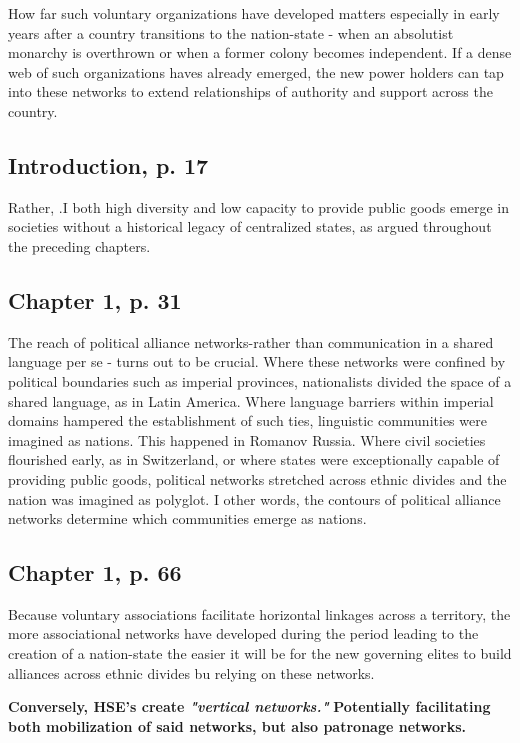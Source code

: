 \documentclass[12pt]{article}
\begin{document}
\bigskip

How far such voluntary organizations have developed matters especially in early
years after a country transitions to the nation-state - when an absolutist
monarchy is overthrown or when a former colony becomes independent.  If a dense
web of such organizations haves already emerged, the new power holders can tap
into these networks to extend relationships of authority and support across the
country. 

\subsection{Introduction, p. 17}

Rather, .I both high diversity and low capacity to provide public goods emerge
in societies without a historical legacy of centralized states, as argued
throughout the preceding chapters.

\subsection{Chapter 1, p. 31}

The reach of political alliance networks-rather than communication in a shared
language per se - turns out to be crucial.  Where these networks were confined
by political boundaries such as imperial provinces, nationalists divided the
space of a shared language, as in Latin America.  Where language barriers within
imperial domains hampered the establishment of such ties, linguistic communities
were imagined as nations.  This happened in Romanov Russia.  Where civil
societies flourished early, as in Switzerland, or where states were
exceptionally capable of providing public goods, political networks stretched
across ethnic divides and the nation was imagined as polyglot.  I other words,
the contours of political alliance networks determine which communities emerge
as nations.

\subsection{Chapter 1, p. 66}

Because voluntary associations facilitate horizontal linkages across a
territory, the more associational networks have developed during the period
leading to the creation of a nation-state the easier it will be for the new
governing elites to build alliances across ethnic divides bu relying on these
networks.

\textbf{Conversely, HSE's create \textit{"vertical networks."}}
\textbf{Potentially facilitating both mobilization of said networks, but also
patronage networks.} 
\end{document}

